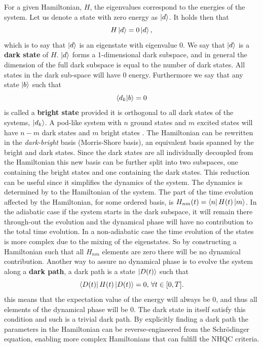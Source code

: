 For a given Hamiltonian, $H$, the eigenvalues correspond to the energies of the system. Let us denote a state with zero energy as $\ket{d}$. It holds then that
\begin{equation}
H\ket{d} = 0\ket{d},
\end{equation}
which is to say that $\ket{d}$ is an eigenstate with eigenvalue $0$. We say that $\ket{d}$ is a \textbf{dark state} of $H$. $\ket{d}$ forms a 1-dimensional dark subspace, and in general the dimension of the full dark subspace is equal to the number of dark states. All states in the dark sub-space will have $0$ energy. Furthermore we say that any state $\ket{b}$ such that 
\begin{equation}
\bra{d_k}\ket{b} = 0
\end{equation}
is called a \textbf{bright state} provided it is orthogonal to all dark states of the systems, $\ket{d_k}$. A pod-like system with $n$ ground states and $m$ excited states will have $n-m$ dark states and $m$ bright states \cite{lambda}.
The Hamiltonian can be rewritten in the \textit{dark-bright} basis (Morris-Shore basis), an equivalent basis spanned by the bright and dark states. Since the dark states are all individually decoupled from the Hamiltonian this new basis can be further split into two subspaces, one containing the bright states and one containing the dark states. This reduction can be useful since it simplifies the dynamics of the system. 
The dynamics is determined by to the Hamiltonian of the system. The part of the time evolution affected by the Hamiltonian, for some ordered basis, is $H_{nm}(t) = \bra{n}H(t)\ket{m}$. In the adiabatic case if the system starts in the dark subspace, it will remain there through-out the evolution and the dynamical phase will have no contribution to the total time evolution. In a non-adiabatic case the time evolution of the states is more complex due to the mixing of the eigenstates. So by constructing a Hamiltonian such that all $H_{nm}$ elements are zero there will be no dynamical contribution. Another way to assure no dynamical phase is to evolve the system along a \textbf{dark path}, a dark path is a state $\ket{D(t)}$ such that 
\begin{equation}
\bra{D(t)}H(t)\ket{D(t)} = 0, \, \forall t\in[0,T].
\end{equation}
this means that the expectation value of the energy will always be $0$, and thus all elements of the dynamical phase will be $0$. The dark state in itself satisfy this condition and such is a trivial dark path. By explicitly finding a dark path the parameters in the Hamiltonian can be reverse-engineered from the Schrödinger equation, enabling more complex Hamiltonians that can fulfill the NHQC criteria.


